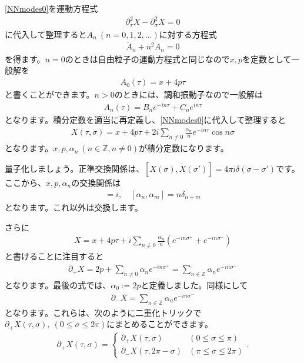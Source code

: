 \documentclass[report,paper=a4, fontsize=12pt, line_length=16cm, number_of_lines=33,dvipdfmx]{jlreq}
\numberwithin{equation}{chapter}
\numberwithin{equation}{section}
\newcommand{\Zb}{\mathbb{Z}}
\newcommand{\del}{\partial}
\begin{document}
\eqref{NNmodes0}を運動方程式
\begin{align}
  \del_{\tau}^2X-\del_{\sigma}^2X=0
\end{align}
に代入して整理すると$A_n\ (n=0,1,2,\dots)$に対する方程式
\begin{align}
  \ddot{A}_{n}+n^2 A_n=0
\end{align}
を得ます。$n=0$のときは自由粒子の運動方程式と同じなので$x,p$を定数として一般解を
\begin{align}
  A_{0}(\tau)=x+4p\tau
\end{align}
と書くことができます。$n>0$のときには、調和振動子なので一般解は
\begin{align}
  A_{n}(\tau)=B_{n}e^{-in\tau}+C_{n}e^{in\tau}
\end{align}
となります。積分定数を適当に再定義し、\eqref{NNmodes0}に代入して整理すると
\begin{align}
  X(\tau,\sigma)=x+4p\tau+2i\sum_{n\ne 0}
  \frac{\alpha_{n}}{n}e^{-in\tau}\cos n\sigma
\end{align}
となります。$x,p,\alpha_{n}\ (n\in \Zb, n \ne 0)$が積分定数になります。

量子化しましょう。正準交換関係は、$[X(\sigma),\dot{X}(\sigma')]=4\pi i \delta(\sigma-\sigma')$です。ここから、$x,p,\alpha_{n}$の交換関係は
\begin{align}
  [x,p]=i,\quad [\alpha_{n},\alpha_{m}]=n\delta_{n+m}
\end{align}
となります。これ以外は交換します。

さらに
\begin{align}
  X=x+4p\tau+i\sum_{n\ne 0}\frac{\alpha_{n}}{n}(e^{-in\sigma^{+}}+e^{-in\sigma^{-}})
\end{align}
と書けることに注目すると
\begin{align}
  \del_{+}X=2p+\sum_{n\ne 0}\alpha_{n}e^{-in\sigma^{+}}
  =\sum_{n\in \Zb}\alpha_{n}e^{-in\sigma^{+}}
\end{align}
となります。最後の式では、$\alpha_{0}:=2p$と定義しました。同様にして
\begin{align}
  \del_{-}X=\sum_{n\in \Zb}\alpha_{n}e^{-in\sigma^{-}}
\end{align}
となります。これらは、次のように二重化トリックで$\del_{+}X(\tau,\sigma),\ (0\le \sigma \le 2\pi)$にまとめることができます。
\begin{align}
  \del_{+}X(\tau,\sigma)=
  \begin{cases}
    \del_{+}X(\tau,\sigma)& (0\le \sigma \le \pi)\\
    \del_{-}X(\tau,2\pi-\sigma) & (\pi\le \sigma \le 2\pi)
  \end{cases}.
\end{align}
\end{document}
